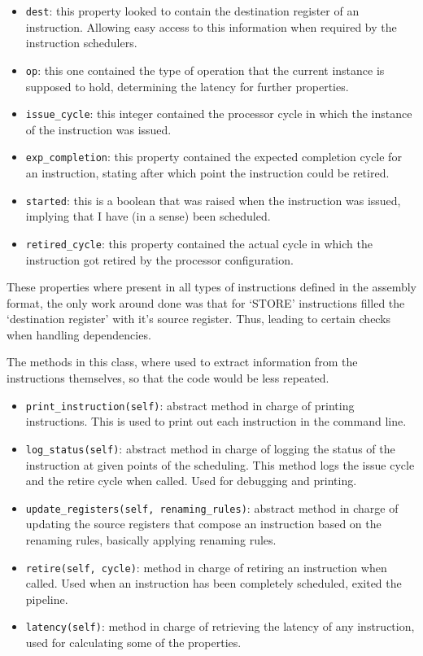 \documentclass{article}
\begin{document}
\begin{itemize}
    \item \lstinline|dest|: this property looked to contain the destination register of an instruction. Allowing easy access to this information when required by the instruction schedulers.
    \item \lstinline|op|: this one contained the type of operation that the current instance is supposed to hold, determining the latency for further properties.
    \item \lstinline|issue_cycle|: this integer contained the processor cycle in which the instance of the instruction was issued.
    \item \lstinline|exp_completion|: this property contained the expected completion cycle for an instruction, stating after which point the instruction could be retired. 
    \item \lstinline|started|: this is a boolean that was raised when the instruction was issued, implying that I have (in a sense) been scheduled. 
    \item \lstinline|retired_cycle|: this property contained the actual cycle in which the instruction got retired by the processor configuration.
\end{itemize}

These properties where present in all types of instructions defined in the assembly format, the only work around done was that for `STORE' instructions filled the `destination register' with it's source register. Thus, leading to certain checks when handling dependencies.

The methods in this class, where used to extract information from the instructions themselves, so that the code would be less repeated. 

\begin{itemize}
    \item \lstinline|print_instruction(self)|: abstract method in charge of printing instructions. This is used to print out each instruction in the command line.
    \item \lstinline|log_status(self)|: abstract method in charge of logging the status of the instruction at given points of the scheduling. This method logs the issue cycle and the retire cycle when called. Used for debugging and printing.
    \item \lstinline|update_registers(self, renaming_rules)|: abstract method in charge of updating the source registers that compose an instruction based on the renaming rules, basically applying renaming rules.
    \item \lstinline|retire(self, cycle)|: method in charge of retiring an instruction when called. Used when an instruction has been completely scheduled, exited the pipeline.
    \item \lstinline|latency(self)|: method in charge of retrieving the latency of any instruction, used for calculating some of the properties.
\end{itemize}
\end{document}
